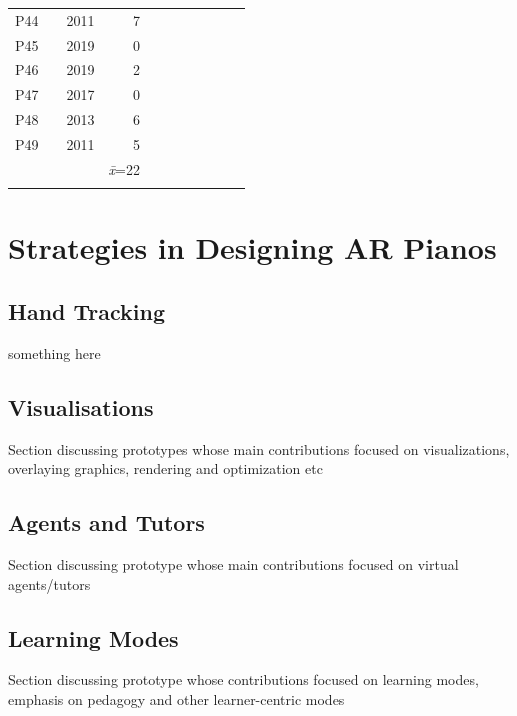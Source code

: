 \documentclass[manuscript,screen]{acmart}
\begin{document}
\begin{table}[]
\begin{tabular}{llrrccccccl}
P44   &  \citet{xiao2011duet}               & 2011 & 7          &                  &       &         &   &     & &          \\
P45   & \citet{xu20195}                     & 2019 & 0          &                  &       &         &   &     & &          \\
P46   & \citet{oku2019novel}                & 2019 & 2          &                  &       &         &   &     & &          \\
P47   & \citet{birhanu2017interactive}      & 2017 & 0          &                  &       &         &   &      & &         \\
P48   &  \citet{rahman2013hand}             & 2013 & 6          &                  &       &         &   &     & &          \\
P49   & \citet{mostafizur2011application}   & 2011 & 5          &                  &       &         &   &       & &        \\ \hline
   &    &  & \textit{\={x}}=22          &                  &       &            &       & &        \\ \hline
\label{tab:overview}
\end{tabular}
\end{table}


\section{Strategies in Designing AR Pianos}
\label{sec: strat}
\subsection{Hand Tracking}
something here 
\subsection{Visualisations}
Section discussing prototypes whose main contributions focused on visualizations, overlaying graphics, rendering and optimization etc
\subsection{Agents and Tutors}
Section discussing prototype whose main contributions focused on virtual agents/tutors 
\subsection{Learning Modes}
Section discussing prototype whose contributions focused on learning modes, emphasis on pedagogy and other learner-centric modes
\end{document}
